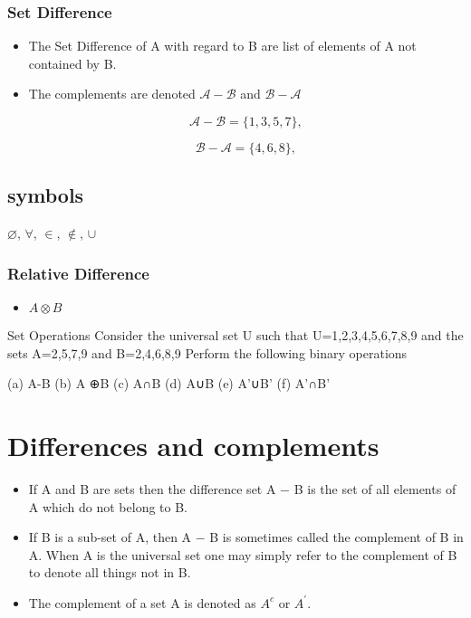 

\subsubsection*{Set Difference}

\begin{itemize}


\item The Set Difference of A with regard to B are list of elements of A not contained by B.


\item The complements are denoted $\mathcal{A-B}$ and $\mathcal{B-A}$

\[ \mathcal{A-B} = \{1,3,5,7\}, \]


\[ \mathcal{B-A} = \{4,6,8\}, \]

\end{itemize}

\subsection*{symbols}
$\varnothing$,
$\forall$,
$\in$,
$\notin$,
$\cup$


\newpage



\subsubsection*{Relative Difference}
\begin{itemize}
\item $ A \otimes B$
\end{itemize}

Set Operations
Consider the universal set U such that U={1,2,3,4,5,6,7,8,9}  and the sets A={2,5,7,9}  and  B={2,4,6,8,9} 
Perform the following binary operations

(a) A-B
(b) A ⊕B
(c) A∩B
(d) A∪B
(e) A'∪B'
(f) A'∩B'



\section{Differences and complements}


	\begin{itemize}
		\item If A and B are sets then the difference set A − B is the set of all elements
		of A which do not belong to B.
		\item If B is a sub-set of A, then A − B is sometimes called the complement of
		B in A. When A is the universal set one may simply refer to the
		complement of B to denote all things not in B. \item The complement of a set A
		is denoted as $A^c$ or $A^{\prime}$.
	\end{itemize}

